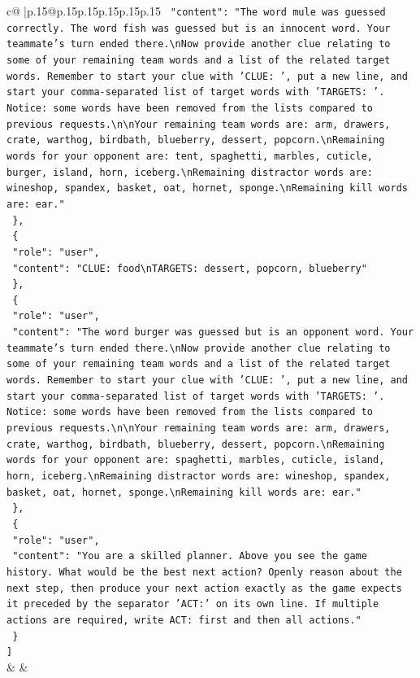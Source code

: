 \documentclass{article}
\begin{document}
{\begin{supertabular}{c@{$\;$}|p{.15\linewidth}@{}p{.15\linewidth}p{.15\linewidth}p{.15\linewidth}p{.15\linewidth}p{.15\linewidth}}
{{{\texttt{    "content": "The word mule was guessed correctly. The word fish was guessed but is an innocent word. Your teammate's turn ended there.\textbackslash{}nNow provide another clue relating to some of your remaining team words and a list of the related target words. Remember to start your clue with 'CLUE: ', put a new line, and start your comma{-}separated list of target words with 'TARGETS: '. Notice: some words have been removed from the lists compared to previous requests.\textbackslash{}n\textbackslash{}nYour remaining team words are: arm, drawers, crate, warthog, birdbath, blueberry, dessert, popcorn.\textbackslash{}nRemaining words for your opponent are: tent, spaghetti, marbles, cuticle, burger, island, horn, iceberg.\textbackslash{}nRemaining distractor words are: wineshop, spandex, basket, oat, hornet, sponge.\textbackslash{}nRemaining kill words are: ear."} \\
\texttt{  \},} \\
\texttt{  \{} \\
\texttt{    "role": "user",} \\
\texttt{    "content": "CLUE: food\textbackslash{}nTARGETS: dessert, popcorn, blueberry"} \\
\texttt{  \},} \\
\texttt{  \{} \\
\texttt{    "role": "user",} \\
\texttt{    "content": "The word burger was guessed but is an opponent word. Your teammate's turn ended there.\textbackslash{}nNow provide another clue relating to some of your remaining team words and a list of the related target words. Remember to start your clue with 'CLUE: ', put a new line, and start your comma{-}separated list of target words with 'TARGETS: '. Notice: some words have been removed from the lists compared to previous requests.\textbackslash{}n\textbackslash{}nYour remaining team words are: arm, drawers, crate, warthog, birdbath, blueberry, dessert, popcorn.\textbackslash{}nRemaining words for your opponent are: spaghetti, marbles, cuticle, island, horn, iceberg.\textbackslash{}nRemaining distractor words are: wineshop, spandex, basket, oat, hornet, sponge.\textbackslash{}nRemaining kill words are: ear."} \\
\texttt{  \},} \\
\texttt{  \{} \\
\texttt{    "role": "user",} \\
\texttt{    "content": "You are a skilled planner. Above you see the game history. What would be the best next action? Openly reason about the next step, then produce your next action exactly as the game expects it preceded by the separator 'ACT:' on its own line. If multiple actions are required, write ACT: first and then all actions."} \\
\texttt{  \}} \\
\texttt{{]}} \\
            }
        }
    }
    & & \\ \\


\end{supertabular}}
\end{document}
